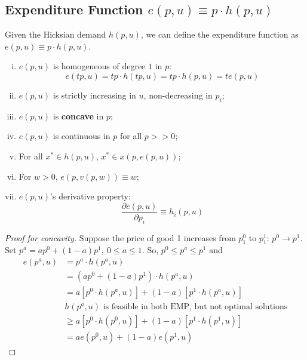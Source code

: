 \documentclass[11pt]{elegantbook}
\begin{document}
\subsection{Expenditure Function $e(p,u)\equiv p\cdot h(p,u)$}
Given the Hicksian demand $h(p,u)$, we can define the expenditure function as $e(p,u)\equiv p\cdot h(p,u)$.
\begin{proposition}\label{expen}
    \begin{enumerate}[(i).]
        \item $e ( p, u )$ is homogeneous of degree $1$ in $p$: $$e(tp,u)=tp\cdot h(tp,u)=tp\cdot h(p,u)=t e(p,u)$$
        \item $e ( p, u )$ is strictly increasing in $u$, non-decreasing in $p_i$;
        \item $e ( p, u )$ is \textbf{concave} in $p$;
        \item $e ( p, u )$ is continuous in $p$ for all $p>>0$;
        \item For all $x^*\in h(p,u)$, $x^*\in x(p,e(p,u))$;
        \item For $w>0$, $e(p,v(p,w))\equiv w$;
        \item $e(p,u)$'s derivative property: $$\frac{\partial e(p, u)}{\partial p_{i}} \equiv h_{i}(p, u)$$
    \end{enumerate}
\end{proposition}
\begin{proof}[Proof for concavity]
    Suppose the price of good 1 increases from $p_1^0$ to $p_1^1$: $p^0 \rightarrow	p^1$. Set $p^a=ap^0+(1-a)p^1,\ 0\leq a\leq 1$. So, $p^0\leq p^a\leq p^1$ and
    \begin{equation}
        \begin{aligned}
            e(p^a,u)&=p^a\cdot h(p^a,u)\\
            &=(ap^0+(1-a)p^1)\cdot h(p^a,u)\\
            &=a[p^0\cdot h(p^a,u)]+(1-a)[p^1\cdot h(p^a,u)]\\
            &h(p^a,u)\text{ is feasible in both EMP, but not optimal solutions}\\
            &\geq a[p^0\cdot h(p^0,u)]+(1-a)[p^1\cdot h(p^1,u)]\\
            &= ae(p^0,u)+(1-a)e(p^1,u)
        \end{aligned}
        \nonumber
    \end{equation}
\end{proof}
\end{document}
